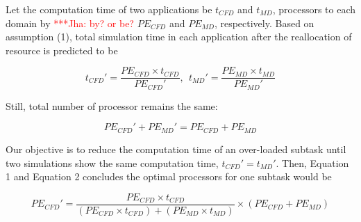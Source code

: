 \documentclass[conference,final]{IEEEtran}
\newcommand{\jhanote}[1]{ {\textcolor{red} { ***Jha: #1 }}}
\newcommand{\jhanote}[1]{}
\begin{document}



Let the computation time of two applications be $t_{CFD}$ and $t_{MD}$, processors to each domain by \jhanote{by? or be?} $PE_{CFD}$ and $PE_{MD}$, respectively. Based on assumption (1), total simulation time in each application after the reallocation of resource is predicted to be

\begin{equation}
t_{CFD}' = \frac {PE_{CFD} \times t_{CFD}} {PE_{CFD}'} , ~~ t_{MD}' = \frac {PE_{MD} \times t_{MD}} {PE_{MD}'}
\end{equation}

Still, total number of processor remains the same:

\begin{equation}
PE_{CFD}' + PE_{MD}' = PE_{CFD} + PE_{MD}
\end{equation}

Our objective is to reduce the computation time of an over-loaded subtask until two simulations show the same computation time, $t_{CFD}' = t_{MD}'$. Then, Equation 1 and Equation 2 concludes the optimal processors for one subtask would be

\begin{equation}
PE_{CFD}' = \frac {PE_{CFD} \times t_{CFD}} {(PE_{CFD} \times t_{CFD}) + (PE_{MD} \times t_{MD})} \times {(PE_{CFD} + PE_{MD})}
\end{equation}
\end{document}
